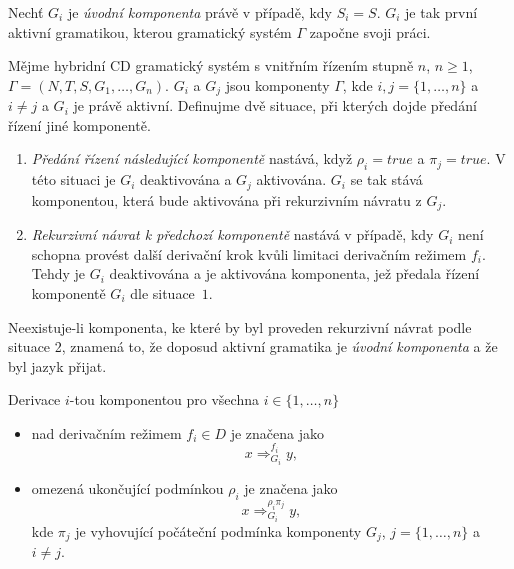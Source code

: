 \begin{konvence}
  Nechť $G_{i}$ je \emph{úvodní komponenta} právě v případě, kdy $S_i = S$. $G_i$ je tak první aktivní gramatikou, kterou gramatický systém $\Gamma$ započne svoji práci.
\end{konvence}

\begin{definice} \label{defKomunikacniProtokol}
  Mějme hybridní CD gramatický systém s vnitřním řízením stupně $n$, $n \geq 1$, $\Gamma = (N, T, S, G_1, \dots, G_n)$.
  $G_i$ a $G_j$ jsou komponenty $\Gamma$, kde $i, j = \{1, \dots, n\}$ a $i \neq j$ a $G_i$ je právě aktivní.
  Definujme dvě situace, při kterých dojde
  předání řízení jiné komponentě.
  \begin{enumerate}
    \item \emph{Předání řízení následující komponentě} nastává, když $\rho_i = true$ a $\pi_j = true$. V této situaci je $G_i$ deaktivována a $G_j$ aktivována.
    $G_i$ se tak stává komponentou, která bude aktivována při rekurzivním návratu z $G_j$.
    \item \emph{Rekurzivní návrat k předchozí komponentě} nastává v případě, kdy $G_i$ není schopna provést další derivační krok kvůli limitaci
    derivačním režimem $f_i$. Tehdy je $G_i$ deaktivována a je aktivována komponenta, jež předala řízení komponentě $G_i$ dle situace~$1$.
  \end{enumerate}
  Neexistuje-li komponenta, ke které by byl proveden rekurzivní návrat podle situace 2, znamená to, že doposud aktivní gramatika je \emph{úvodní komponenta} a že byl jazyk přijat.
\end{definice}

\begin{konvence}
  Derivace $i$-tou komponentou pro všechna $i \in \{1, \dots, n\}$
  \begin{itemize}
    \item nad derivačním režimem $f_i \in D$ je značena jako $$x \Rightarrow_{G_i}^{f_i} y,$$
    \item omezená ukončující podmínkou $\rho_i$ je značena jako $$x \Rightarrow_{G_i}^{\rho_i\pi_j} y,$$ kde $\pi_j$ je vyhovující počáteční podmínka
    komponenty $G_j$,  $j = \{1, \dots, n\}$ a $i \neq j$.
  \end{itemize}
\end{konvence}

